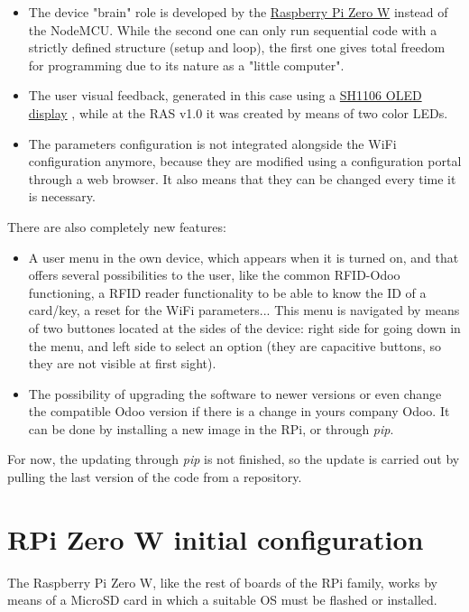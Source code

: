 \documentclass[12pt,a4paper,oneside]{article} %
\begin{document}
\begin{itemize}
	\item The device "brain" role is developed by the \href{https://www.raspberrypi.org/products/raspberry-pi-zero-w/}{Raspberry Pi Zero W} \citep{rpi} instead of the NodeMCU. While the second one can only run sequential code with a strictly defined structure (setup and loop), the first one gives total freedom for programming due to its nature as a "little computer".
	\item The user visual feedback, generated in this case using a \href{https://www.elecrow.com/download/SH1106\%20datasheet.pdf}{SH1106 OLED display} \citep{oled}, while at the RAS v1.0 it was created by means of two color LEDs.
	\item The parameters configuration is not integrated alongside the WiFi configuration anymore, because they are modified using a configuration portal through a web browser. It also means that they can be changed every time it is necessary.
\end{itemize}

There are also completely new features:

\begin{itemize}
	\item A user menu in the own device, which appears when it is turned on, and that offers several possibilities to the user, like the common RFID-Odoo functioning, a RFID reader functionality to be able to know the ID of a card/key, a reset for the WiFi parameters... This menu is navigated by means of two buttones located at the sides of the device: right side for going down in the menu, and left side to select an option (they are capacitive buttons, so they are not visible at first sight).
	\item The possibility of upgrading the software to newer versions or even change the compatible Odoo version if there is a change in yours company Odoo. It can be done by installing a new image in the RPi, or through \emph{pip}.
\end{itemize}

For now, the updating through \emph{pip} is not finished, so the update is carried out by pulling the last version of the code from a repository.


\section{RPi Zero W initial configuration}

The Raspberry Pi Zero W, like the rest of boards of the RPi family, works by means of a MicroSD card in which a suitable OS must be flashed or installed. 
\end{document}
